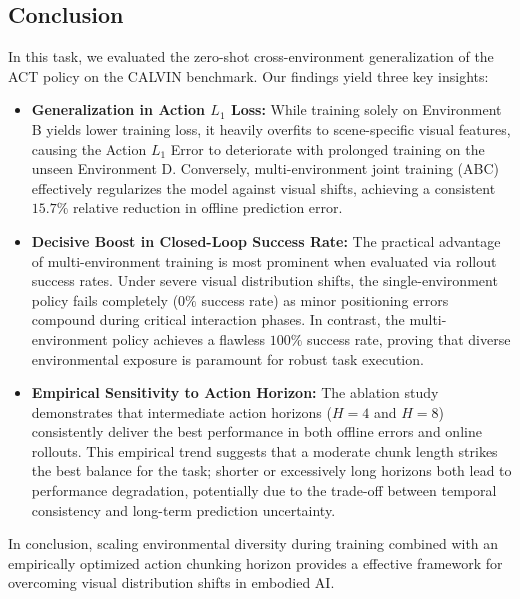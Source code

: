 \subsection{Conclusion}

In this task, we evaluated the zero-shot cross-environment generalization of the ACT policy on the CALVIN benchmark. Our findings yield three key insights:

\begin{itemize}
    \item \textbf{Generalization in Action $L_1$ Loss:} While training solely on Environment B yields lower training loss, it heavily overfits to scene-specific visual features, causing the Action $L_1$ Error to deteriorate with prolonged training on the unseen Environment D. Conversely, multi-environment joint training (ABC) effectively regularizes the model against visual shifts, achieving a consistent $15.7\%$ relative reduction in offline prediction error.
    \item \textbf{Decisive Boost in Closed-Loop Success Rate:} The practical advantage of multi-environment training is most prominent when evaluated via rollout success rates. Under severe visual distribution shifts, the single-environment policy fails completely ($0\%$ success rate) as minor positioning errors compound during critical interaction phases. In contrast, the multi-environment policy achieves a flawless $100\%$ success rate, proving that diverse environmental exposure is paramount for robust task execution.
    \item \textbf{Empirical Sensitivity to Action Horizon:} The ablation study demonstrates that intermediate action horizons ($H=4$ and $H=8$) consistently deliver the best performance in both offline errors and online rollouts. This empirical trend suggests that a moderate chunk length strikes the best balance for the task; shorter or excessively long horizons both lead to performance degradation, potentially due to the trade-off between temporal consistency and long-term prediction uncertainty.
\end{itemize}

In conclusion, scaling environmental diversity during training combined with an empirically optimized action chunking horizon provides a effective framework for overcoming visual distribution shifts in embodied AI.
